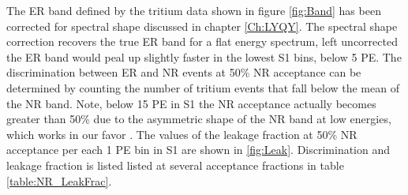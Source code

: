 \newpage

The ER band defined by the tritium data shown in figure \ref{fig:Band} has been corrected for spectral shape discussed in chapter \ref{Ch:LYQY}. The spectral shape correction recovers the true ER band for a flat energy spectrum, left uncorrected the ER band would peal up slightly faster in the lowest S1 bins, below 5 PE. The discrimination between ER and NR events at 50\% NR acceptance can be determined by counting the number of tritium events that fall below the mean of the NR band. Note, below 15 PE in S1 the NR acceptance actually becomes greater than 50\% due to the asymmetric shape of the NR band at low energies, which works in our favor \cite{NEST} \cite{NEST_2013}. The values of the leakage fraction at 50\% NR acceptance per each 1 PE bin in S1 are shown in \ref{fig:Leak}. Discrimination and leakage fraction is listed listed at several acceptance fractions in table \ref{table:NR_LeakFrac}.

